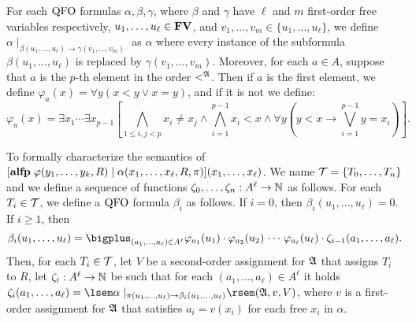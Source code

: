 
For each ${\rm QFO}$ formulas $\alpha, \beta, \gamma$, where $\beta$ and $\gamma$ have $\ell$ and $m$ first-order free variables respectively, $u_1,\ldots,u_{\ell} \in \mathbf{FV}$, and $v_1,\ldots,v_m \in \{u_1,\ldots,u_{\ell}\}$, we define $\alpha\mid_{\beta(u_1,\ldots,u_{\ell})\to\gamma(v_1,\ldots,v_{m})}$ as $\alpha$ where every instance of the subformula $\beta(u_1,\ldots,u_{\ell})$ is replaced by $\gamma(v_1,\ldots,v_{m})$. Moreover, for each $a\in A$, suppose that $a$ is the $p$-th element in the order $<^{\mathfrak{A}}$. Then if $a$ is the first element, we define $\varphi_a(x) = \forall y(x < y \vee x = y)$, and if it is not we define:
$$
\varphi_a(x) = \exists x_1 \cdots \exists x_{p-1}[\bigwedge_{1\leq i,j < p}x_i\neq x_j \wedge \bigwedge_{i = 1}^{p-1} x_i < x \wedge \forall y(y < x \to \bigvee_{i = 1}^{p-1} y = x_i)].
$$

To formally characterize the semantics of $[{\bf alfp} \;\varphi(y_1,\ldots,y_k,R)\mid\alpha(x_1,\ldots,x_{\ell},R,\pi)](x_1,\ldots,x_{\ell})$. %
We name $\mathcal{T} = \{T_0,\ldots,T_n\}$ and we define a sequence of functions $\zeta_0,\ldots,\zeta_n:A^{\ell}\to\mathbb{N}$ as follows. For each $T_i \in \mathcal{T}$, we define a ${\rm QFO}$ formula $\beta_i$ as follows. If $i = 0$, then $\beta_i(u_1,\ldots,u_{\ell}) = 0$. If $i \geq 1$, then
$$
\beta_i(u_1,\ldots,u_{\ell}) = \bigplus_{(a_1,\ldots,a_{\ell})\in A^{\ell}} \varphi_{a_1}(u_1)\cdot\varphi_{a_2}(u_2)\,\cdots\,\varphi_{a_{\ell}}(u_{\ell})\cdot \zeta_{i-1}(a_1,\ldots,a_{\ell}).
$$
Then, for each $T_i \in \mathcal{T}$, let $V$ be a second-order assignment for $\mathfrak{A}$ that assigns $T_i$ to $R$, let $\zeta_i: A^{\ell}\to\mathbb{N}$ be such that for each $(a_1,\ldots,a_{\ell})\in A^{\ell}$ it holds $\zeta_i(a_1,\ldots,a_{\ell}) = \sem{\alpha\mid_{\pi(u_1,\ldots,u_{\ell})\to \beta_i(u_1,\ldots,u_{\ell})}}(\A,v,V)$, where $v$ is a first-order assignment for $\mathfrak{A}$ that satisfies $a_i = v(x_i)$ for each free $x_i$ in $\alpha$.

